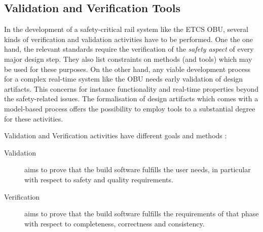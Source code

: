 \documentclass{template/openetcs_article}
\begin{document}
\subsection{Validation and Verification Tools}

In the development of a safety-critical rail system like the ETCS OBU,
several kinds of verification and validation activities have to be
performed. One the one hand, the relevant standards require the
verification of the \emph{safety aspect} of every major design
step. They also list constraints on methods (and tools) which may be used for these
purposes.  On the other hand, any viable development process for a
complex real-time system like the OBU needs early validation of design
artifacts. This concerns for instance functionality and real-time
properties beyond the safety-related issues. The formalisation of
design artifacts which comes with a model-based process offers the
possibility to employ tools to a substantial degree for these
activities. 


 


Validation and Verification activities have different goals and methods :
\begin{description}
\item [Validation] aims to prove that the build software fulfills the user needs, in particular with respect to safety and quality requirements.
\item [Verification] aims to prove that the build software fulfills the requirements of that
phase with respect to completeness, correctness and consistency.
\end{description}
\end{document}
